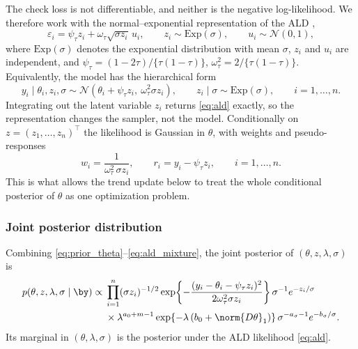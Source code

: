The check loss is not differentiable, and neither is the negative log-likelihood. We therefore work with the normal--exponential representation of the ALD \citep{kozumi2011gibbs},
\begin{equation}
    \varepsilon_i = \psi_\tau z_i + \omega_\tau \sqrt{\sigma z_i}\, u_i, \qquad z_i \sim \mathrm{Exp}(\sigma), \qquad u_i \sim \mathcal{N}(0,1),
    \label{eq:ald_mixture}
\end{equation}
where $\mathrm{Exp}(\sigma)$ denotes the exponential distribution with mean $\sigma$, $z_i$ and $u_i$ are independent, and $\psi_\tau = (1-2\tau)/\{\tau(1-\tau)\}$, $\omega_\tau^2 = 2/\{\tau(1-\tau)\}$. Equivalently, the model has the hierarchical form
\[
    y_i \mid \theta_i, z_i, \sigma \sim \mathcal{N}\!\left(\theta_i + \psi_\tau z_i,\ \omega_\tau^2 \sigma z_i\right), \qquad z_i \mid \sigma \sim \mathrm{Exp}(\sigma), \qquad i = 1, \ldots, n.
\]
Integrating out the latent variable $z_i$ returns \eqref{eq:ald} exactly, so the representation changes the sampler, not the model. Conditionally on $z = (z_1,\ldots,z_n)^\top$ the likelihood is Gaussian in $\theta$, with weights and pseudo-responses
\begin{equation}
    w_i = \frac{1}{\omega_\tau^2\, \sigma z_i}, \qquad r_i = y_i - \psi_\tau z_i, \qquad i = 1,\ldots,n.
    \label{eq:weights}
\end{equation}
This is what allows the trend update below to treat the whole conditional posterior of $\theta$ as one optimization problem.

\subsubsection{Joint posterior distribution}

Combining \eqref{eq:prior_theta}--\eqref{eq:ald_mixture}, the joint posterior of $(\theta, z, \lambda, \sigma)$ is
\begin{equation}
\begin{aligned}
    p(\theta, z, \lambda, \sigma \mid \by) \propto{} & \prod_{i=1}^n (\sigma z_i)^{-1/2} \exp\!\left\{-\frac{(y_i-\theta_i-\psi_\tau z_i)^2}{2\omega_\tau^2 \sigma z_i}\right\} \sigma^{-1} e^{-z_i/\sigma} \\
    & \times \lambda^{a_0 + m - 1} \exp\!\left\{-\lambda\left(b_0 + \norm{D\theta}_1\right)\right\} \sigma^{-a_\sigma - 1} e^{-b_\sigma/\sigma}.
\end{aligned}
    \label{eq:posterior}
\end{equation}
Its marginal in $(\theta, \lambda, \sigma)$ is the posterior under the ALD likelihood \eqref{eq:ald}.

